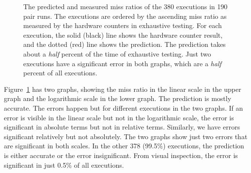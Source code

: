 \begin{figure}[t]
  \centering
  \hfill
  \hfill
  \caption{The predicted and measured miss ratios of the 380
    executions in 190 pair runs. The executions are ordered by the
    ascending miss ratio as measured by the hardware counters in
    exhaustive testing.  For each execution, the solid (black) line
    shows the hardware counter result, and the dotted (red) line shows
    the prediction.  The prediction takes about a \emph{half} percent of the
    time of exhaustive testing.  Just two executions have a significant
    error in both graphs, which are a \emph{half} percent of all executions.}
  \label{fig:co-run}
\end{figure}

Figure~\ref{fig:co-run} has two graphs, showing the miss ratio in the
linear scale in the upper graph and the logarithmic scale in the lower
graph.  The prediction is mostly accurate.  The errors happen but 
for different executions in the two graphs.  If an error is visible in
the linear scale but not in the logarithmic scale, the error is
significant in absolute terms but not in relative terms.  Similarly,
we have errors significant relatively but not absolutely.  The two
graphs show just two errors that are significant in both scales.
In the other 378 (99.5\%) executions, the prediction is either
accurate or the error insignificant.  From visual 
inspection, the error is significant in just 0.5\% of all executions.

